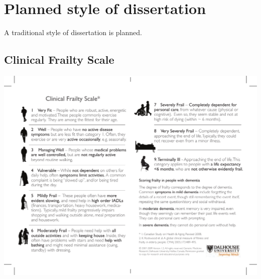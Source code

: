\documentclass
[
	12pt,
	a4paper,
	oneside,
]{article}
\begin{document}
\section{Planned style of dissertation}
A traditional style of dissertation is planned.

\clearpage
\printbibliography

\clearpage
\begin{appendix}

\section{Clinical Frailty Scale}
\label{appendix:CFS}
\includegraphics[width=\textwidth]{CFS}


\end{appendix}
\end{document}
